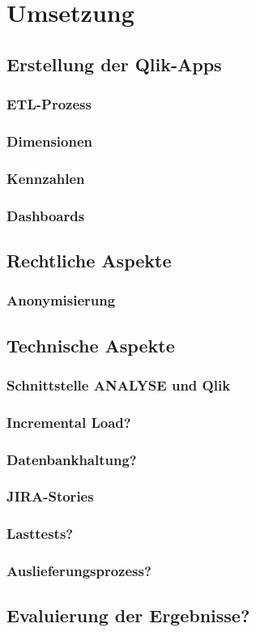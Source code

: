 \chapter{Umsetzung}
\lipsum[1-79]
\section{Erstellung der Qlik-Apps}
\subsection{ETL-Prozess}
\subsection{Dimensionen}
\subsection{Kennzahlen}
\subsection{Dashboards}

\section{Rechtliche Aspekte}
\subsection{Anonymisierung}

\section{Technische Aspekte}
\subsection{Schnittstelle ANALYSE und Qlik}
\subsection{Incremental Load?}
\subsection{Datenbankhaltung?}
\subsection{JIRA-Stories}
\subsection{Lasttests?}
\subsection{Auslieferungsprozess?}

\section{Evaluierung der Ergebnisse?}
